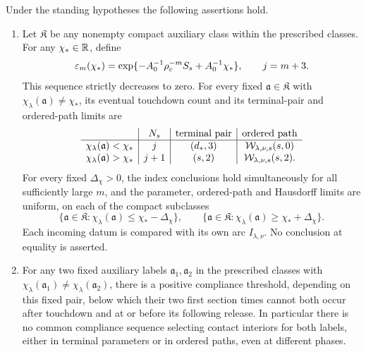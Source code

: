 \begin{proposition}
\label{sel:threshold-selection}
\label{sel:auxiliary-chi}
Under the standing hypotheses the following assertions hold.
\begin{enumerate}[label=\textup{(\roman*)},leftmargin=*]
\item Let $\mathfrak K$ be any nonempty compact auxiliary class within
the prescribed classes. For any $\chi_*\in\mathbb R$, define
\begin{equation}
 \varepsilon_m(\chi_*)
 =\exp\{-A_0^{-1}\rho_c^{-m}S_s+A_0^{-1}\chi_*\},
 \qquad j=m+3.
 \label{sel:threshold-sequence}
\end{equation}
This sequence strictly decreases to zero. For every fixed
$\mathfrak a\in\mathfrak K$ with
$\chi_\lambda(\mathfrak a)\ne\chi_*$, its eventual touchdown
count and its terminal-pair and ordered-path limits are
\[
\begin{array}{c|c|c|c}
 &N_s&\text{terminal pair}&\text{ordered path}\\ \hline
 \chi_\lambda(\mathfrak a)<\chi_* &j&(d_*,3)
   &\mathcal W_{\lambda,\nu,s}(s,0)\\
 \chi_\lambda(\mathfrak a)>\chi_* &j+1&(s,2)
   &\mathcal W_{\lambda,\nu,s}(s,2).
\end{array}
\]
For every fixed $\Delta_\chi>0$, the index conclusions hold
simultaneously for all sufficiently large $m$, and the parameter,
ordered-path and Hausdorff limits are uniform, on each of the
compact subclasses
\[
 \{\mathfrak a\in\mathfrak K:
           \chi_\lambda(\mathfrak a)\le\chi_*-\Delta_\chi\},
 \qquad
 \{\mathfrak a\in\mathfrak K:
           \chi_\lambda(\mathfrak a)\ge\chi_*+\Delta_\chi\}.
\]
Each incoming datum is compared with its own arc $I_{\lambda,\nu}$.
No conclusion at equality is asserted.
\item For any two fixed auxiliary labels
$\mathfrak a_1,\mathfrak a_2$ in the prescribed classes with
$\chi_\lambda(\mathfrak a_1)\ne\chi_\lambda(\mathfrak a_2)$,
there is a positive compliance threshold, depending on this fixed
pair, below which their two first section times cannot both occur
after touchdown and at or before its following release.
In particular there is no common compliance sequence selecting
contact interiors for both labels, either in terminal parameters or
in ordered paths, even at different phases.


\end{enumerate}
\end{proposition}
